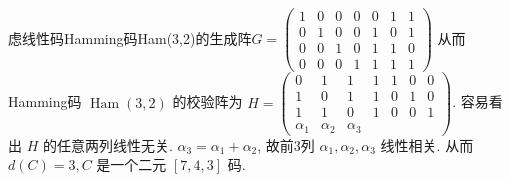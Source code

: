 \begin{example}
    虑线性码Hamming码Ham(3,2)的生成阵$
G=\left(\begin{array}{lllllll}
1 & 0 & 0 & 0 & 0 & 1 & 1 \\
0 & 1 & 0 & 0 & 1 & 0 & 1 \\
0 & 0 & 1 & 0 & 1 & 1 & 0 \\
0 & 0 & 0 & 1 & 1 & 1 & 1
\end{array}\right)
$
从而Hamming码 $ \operatorname{Ham}(3,2) $ 的校验阵为
$
H=\left(\begin{array}{ccccccc}
0 & 1 & 1 & 1 & 1 & 0 & 0 \\
1 & 0 & 1 & 1 & 0 & 1 & 0 \\
1 & 1 & 0 & 1 & 0 & 0 & 1 \\
\alpha_{1} & \alpha_{2} & \alpha_{3} & & & &
\end{array}\right)
$.
容易看出 $ H $ 的任意两列线性无关.
$ \alpha_{3}=\alpha_{1}+\alpha_{2} $, 故前3列 $ \alpha_{1}, \alpha_{2}, \alpha_{3} $ 线性相关.
从而 $ d(C)=3, C $ 是一个二元 $ [7,4,3] $ 码.
\end{example}

